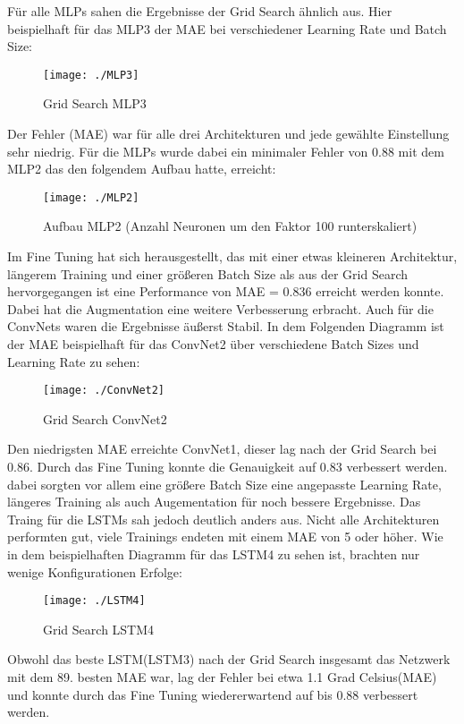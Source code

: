 \documentclass[acmtog, authorversion]{acmart} %
\begin{document}
Für alle MLPs sahen die Ergebnisse der Grid Search ähnlich aus. Hier beispielhaft für das MLP3 der MAE bei verschiedener Learning Rate und Batch Size:
\begin{figure}[H]
    \flushleft
    \texttt{[image: ./MLP3]}
    \label{fig:sub4}
    \caption{Grid Search MLP3}
\end{figure}
Der Fehler (MAE) war für alle drei Architekturen und jede gewählte Einstellung sehr niedrig. Für die MLPs wurde dabei ein minimaler Fehler von 0.88 mit dem MLP2 das den folgendem Aufbau hatte, erreicht: 
\begin{figure}[H]
    \centering
    \texttt{[image: ./MLP2]}
    \label{fig:sub5}
    \caption{Aufbau MLP2 (Anzahl Neuronen um den Faktor 100 runterskaliert)}
\end{figure}
Im Fine Tuning hat sich herausgestellt, das mit einer etwas kleineren Architektur, längerem Training und einer größeren Batch Size als aus der Grid Search hervorgegangen ist eine Performance von MAE = 0.836 erreicht werden konnte. Dabei hat die Augmentation eine weitere Verbesserung erbracht.
Auch für die ConvNets waren die Ergebnisse äußerst Stabil. In dem Folgenden Diagramm ist der MAE beispielhaft für das ConvNet2 über verschiedene Batch Sizes und Learning Rate zu sehen:
\begin{figure}[H]
    \centering
    \texttt{[image: ./ConvNet2]}
    \label{fig:sub6}
    \caption{Grid Search ConvNet2}
\end{figure}
Den niedrigsten MAE erreichte ConvNet1, dieser lag nach der Grid Search bei 0.86. Durch das Fine Tuning konnte die Genauigkeit auf 0.83 verbessert werden. dabei sorgten vor allem eine größere Batch Size eine angepasste Learning Rate, längeres Training als auch Augementation für noch bessere Ergebnisse.
Das Traing für die LSTMs sah jedoch deutlich anders aus. Nicht alle Architekturen performten gut, viele Trainings endeten mit einem MAE von 5 oder höher. Wie in dem beispielhaften Diagramm für das LSTM4 zu sehen ist, brachten nur wenige Konfigurationen Erfolge:
\begin{figure}[H]
    \centering
    \texttt{[image: ./LSTM4]}
    \label{fig:sub7}
    \caption{Grid Search LSTM4}
\end{figure}
Obwohl das beste LSTM(LSTM3) nach der Grid Search insgesamt das Netzwerk mit dem 89. besten MAE war, lag der Fehler bei etwa 1.1 Grad Celsius(MAE) und konnte durch das Fine Tuning wiedererwartend auf bis 0.88 verbessert werden.
\end{document}
